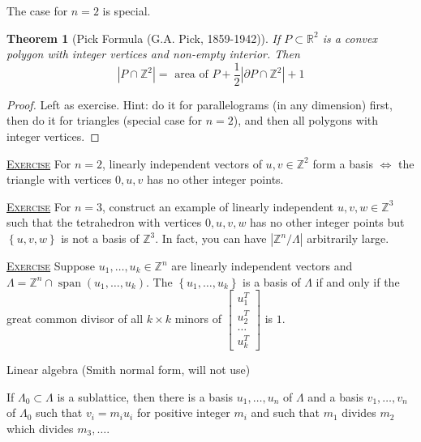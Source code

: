\documentclass{report}
\newcommand{\R}{\mathbb{R}}
\newcommand{\Z}{\mathbb{Z}}
\newcommand{\set}[1]{\left\{ #1 \right\}}
\newcommand{\fancyem}[1]{\underline{\textsc{#1}}}
\newtheorem{theorem}{Theorem}[section]
\theoremstyle{definition}
\theoremstyle{remark}
\numberwithin{equation}{section}
\begin{document}
The case for $n = 2$ is special. 
\begin{theorem}[Pick Formula (G.A. Pick, 1859-1942)]
    If $P \subset \R^2$ is a convex polygon with integer vertices and non-empty interior. Then \[
    |P \cap \Z^2| = \text{ area of } P + \frac{1}{2}|\partial P \cap \Z^2| + 1
    \]
\end{theorem}
\begin{proof}
    Left as exercise. Hint: do it for parallelograms (in any dimension) first, then do it for triangles (special case for $n = 2$), and then all polygons with integer vertices.
\end{proof}

\fancyem{Exercise} For $n = 2$, linearly independent vectors of $u, v \in \Z^2$ form a basis $\iff$ the triangle with vertices $0, u, v$ has no other integer points.

\fancyem{Exercise} For $n = 3$, construct an example of linearly independent $u, v, w \in \Z^3$ such that the tetrahedron  with vertices $0, u, v, w$ has no other integer points but $\set{u, v, w}$ is not a basis of $\Z^3$. In fact, you can have $|\Z^n/\Lambda|$ arbitrarily large.

\fancyem{Exercise} Suppose $u_1, \ldots, u_k \in \Z^n$ are linearly independent vectors and $\Lambda = \Z^n \cap \operatorname{span}(u_1, \ldots, u_k)$. The $\set{u_1, \ldots, u_k}$ is a basis of $\Lambda$ if and only if the great common divisor of all $k \times k$ minors of $\begin{bmatrix}
    u_1^T \\
    u_2^T \\
    \ldots \\
    u_k^T
\end{bmatrix}$ is $1$.

Linear algebra (Smith normal form, will not use)

If $\Lambda_0 \subset \Lambda$ is a sublattice, then there is a basis $u_1, \ldots, u_n$ of $\Lambda$ and a basis $v_1, \ldots, v_n$ of $\Lambda_0$ such that $v_i = m_iu_i$ for positive integer $m_i$ and such that $m_1$ divides $m_2$ which divides $m_3, \ldots$.
\end{document}
